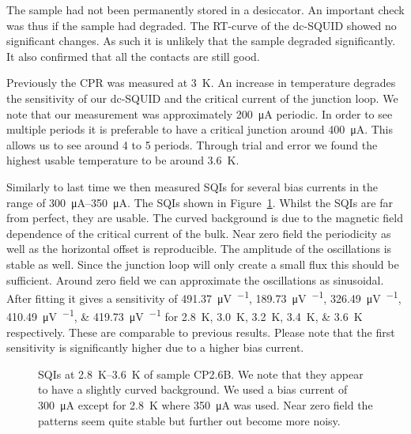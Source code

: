The sample had not been permanently stored in a desiccator. An important check was thus if the sample had degraded. The RT-curve of the dc-SQUID showed no significant changes. As such it is unlikely that the sample degraded significantly. It also confirmed that all the contacts are still good.

Previously the CPR was measured at \qty{3}{\kelvin}. An increase in temperature degrades the sensitivity of our dc-SQUID and the critical current of the junction loop. We note that our measurement was approximately \qty{200}{\micro\ampere} periodic. In order to see multiple periods it is preferable to have a critical junction around \qty{400}{\micro\ampere}. This allows us to see around 4 to 5 periods. Through trial and error we found the highest usable temperature to be around \qty{3.6}{\kelvin}.

Similarly to last time we then measured SQIs for several bias currents in the range of \qtyrange{300}{350}{\micro\ampere}. The SQIs shown in Figure~\ref{fig:CP2.6B_revisited_SQIs}. Whilst the SQIs are far from perfect, they are usable. The curved background is due to the magnetic field dependence of the critical current of the bulk. Near zero field the periodicity as well as the horizontal offset is reproducible. The amplitude of the oscillations is stable as well. Since the junction loop will only create a small flux this should be sufficient. Around zero field we can approximate the oscillations as sinusoidal. After fitting it gives a sensitivity of \qtylist{491.37;189.73;326.49;410.49;419.73}{\micro\volt\per\fluxquantum} for \qtylist{2.8;3.0;3.2;3.4;3.6}{\kelvin} respectively. These are comparable to previous results. Please note that the first sensitivity is significantly higher due to a higher bias current.

\begin{figure}[ht!]
	\centering
	
	\caption{SQIs at \qtyrange{2.8}{3.6}{\kelvin} of sample CP2.6B. We note that they appear to have a slightly curved background. We used a bias current of \qty{300}{\micro\ampere} except for \qty{2.8}{\kelvin} where \qty{350}{\micro\ampere} was used. Near zero field the patterns seem quite stable but further out become more noisy.}
	\label{fig:CP2.6B_revisited_SQIs}
\end{figure}

